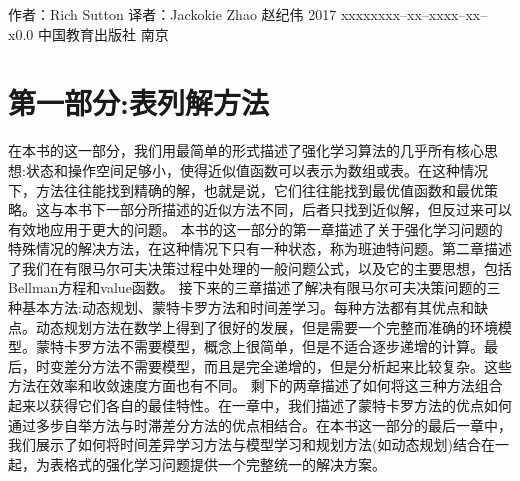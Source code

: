 \documentclass[UTF8]{RL}
\begin{document}
       {作者：Rich Sutton 译者：Jackokie Zhao}
       {赵纪伟}
       {2017}
       {xxxxx}{xxx--xx--xxxx--xx--x}{0.0}
       {中国教育出版社}
       {南京}





\part{第一部分:表列解方法}
在本书的这一部分，我们用最简单的形式描述了强化学习算法的几乎所有核心思想:状态和操作空间足够小，使得近似值函数可以表示为数组或表。在这种情况下，方法往往能找到精确的解，也就是说，它们往往能找到最优值函数和最优策略。这与本书下一部分所描述的近似方法不同，后者只找到近似解，但反过来可以有效地应用于更大的问题。
本书的这一部分的第一章描述了关于强化学习问题的特殊情况的解决方法，在这种情况下只有一种状态，称为班迪特问题。第二章描述了我们在有限马尔可夫决策过程中处理的一般问题公式，以及它的主要思想，包括Bellman方程和value函数。
接下来的三章描述了解决有限马尔可夫决策问题的三种基本方法:动态规划、蒙特卡罗方法和时间差学习。每种方法都有其优点和缺点。动态规划方法在数学上得到了很好的发展，但是需要一个完整而准确的环境模型。蒙特卡罗方法不需要模型，概念上很简单，但是不适合逐步递增的计算。最后，时变差分方法不需要模型，而且是完全递增的，但是分析起来比较复杂。这些方法在效率和收敛速度方面也有不同。
剩下的两章描述了如何将这三种方法组合起来以获得它们各自的最佳特性。在一章中，我们描述了蒙特卡罗方法的优点如何通过多步自举方法与时滞差分方法的优点相结合。在本书这一部分的最后一章中，我们展示了如何将时间差异学习方法与模型学习和规划方法(如动态规划)结合在一起，为表格式的强化学习问题提供一个完整统一的解决方案。







\end{document}
